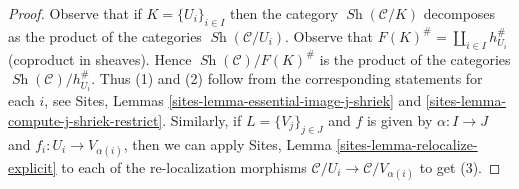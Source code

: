 \documentclass{stacks-project}
\theoremstyle{plain}
\theoremstyle{definition}
\theoremstyle{remark}
\numberwithin{equation}{subsection}
\def\Sh{\mathop{\mathit{Sh}}\nolimits}
\begin{document}
\begin{proof}
Observe that if $K = \{U_i\}_{i \in I}$ then the category
$\Sh(\mathcal{C}/K)$ decomposes as the product of the categories
$\Sh(\mathcal{C}/U_i)$. Observe that
$F(K)^\# = \coprod_{i \in I} h_{U_i}^\#$ (coproduct in sheaves).
Hence $\Sh(\mathcal{C})/F(K)^\#$ is the product of the
categories $\Sh(\mathcal{C})/h_{U_i}^\#$.
Thus (1) and (2) follow from the corresponding
statements for each $i$, see
Sites, Lemmas \ref{sites-lemma-essential-image-j-shriek} and
\ref{sites-lemma-compute-j-shriek-restrict}.
Similarly, if $L = \{V_j\}_{j \in J}$ and $f$ is given
by $\alpha : I \to J$ and $f_i : U_i \to V_{\alpha(i)}$,
then we can apply
Sites, Lemma \ref{sites-lemma-relocalize-explicit}
to each of the re-localization morphisms
$\mathcal{C}/U_i \to \mathcal{C}/V_{\alpha(i)}$
to get (3).
\end{proof}
\end{document}

